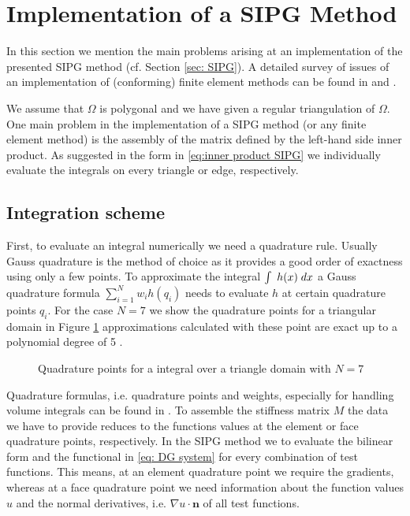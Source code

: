 \section{Implementation of a SIPG Method}

In this section we mention the main problems arising at an implementation of the presented SIPG method (cf. Section \ref{sec: SIPG}). A detailed survey of issues of an implementation of (conforming) finite element methods can be found in \cite[Section 0.6]{BS2002} and \cite[Chapter 8]{Braess2003}. 

We assume that $\Omega$ is polygonal and we have given a regular triangulation of $\Omega$. One main problem in the implementation of a SIPG method (or any finite element method) is the assembly of the matrix defined by the left-hand side inner product. As suggested in the form in \eqref{eq:inner product SIPG} we individually evaluate the integrals on every triangle or edge, respectively. %

\subsection{Integration scheme}
First, to evaluate an integral numerically we need a quadrature rule. Usually Gauss quadrature is the method of choice as it provides a good order of exactness using only a few points. To approximate the integral $\int_{\phantom{x}} {{h(x)}\;dx} $ a Gauss quadrature formula $\sum_{i=1}^{N} w_i h(q_i)$ needs to evaluate $h$ at certain quadrature points $q_i$. For the case $N=7$ we show the quadrature points for a triangular domain in Figure \ref{fig: quadrature} approximations calculated with these point are exact up to a polynomial degree of 5 \cite[p.314]{Strout1971}.
\begin{figure}[!h]
	\centering
	
	\caption{Quadrature points for a integral over a triangle domain with $N=7$}
	 \label{fig: quadrature}
\end{figure}
Quadrature formulas, i.e. quadrature points and weights, especially for handling volume integrals can be found in \cite{Strout1971}.
To assemble the stiffness matrix $M$ the data we have to provide reduces to the functions values at the element or face quadrature points, respectively.  
In the SIPG method we to evaluate the bilinear form and the functional in \eqref{eq: DG system} for every combination of test functions. This means, at an element quadrature point we require the gradients, whereas at a face quadrature point we need information about the function values $u$ and the normal derivatives, i.e. $\nabla u \cdot \mathbf{n}$ of all test functions.

